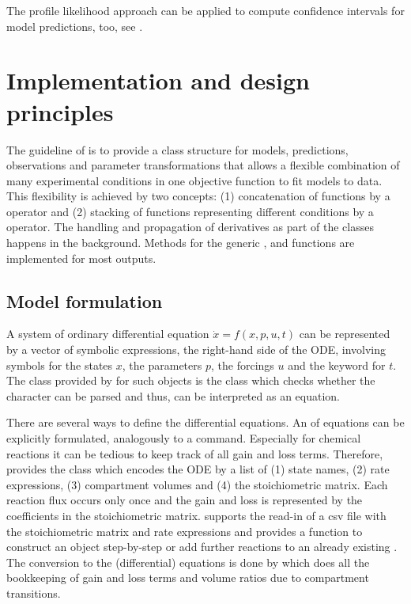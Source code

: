 \documentclass[article]{jss}
\begin{document}
The profile likelihood approach can be applied to compute confidence intervals for model predictions, too, see \citep{kreutz2012likelihood, hass2016fast}.





\section{Implementation and design principles}
\label{sec:implementation}

The guideline of  is to provide a class structure for models, predictions, observations and parameter transformations that allows a flexible combination of many experimental conditions in one objective function to fit models to data. This flexibility is achieved by two concepts: (1) concatenation of functions by a  operator and (2) stacking of functions representing different conditions by a  operator. The handling and propagation of derivatives as part of the classes happens in the background. Methods for the generic ,  and  functions are implemented for most outputs.

\subsection{Model  formulation}

A system of ordinary differential equation $\dot x = f(x, p, u, t)$ can be represented by a  vector of symbolic expressions, the right-hand side of the ODE, involving symbols for the states $x$, the parameters $p$, the forcings $u$ and the keyword  for $t$. The class provided by  for such objects is the  class which checks whether the character can be parsed and thus, can be interpreted as an equation.

There are several ways to define the differential equations. An  of equations can be explicitly formulated, analogously to a  command. Especially for chemical reactions it can be tedious to keep track of all gain and loss terms. Therefore,  provides the  class which encodes the ODE by a list of (1) state names, (2) rate expressions, (3) compartment volumes and (4) the stoichiometric matrix. Each reaction flux occurs only once and the gain and loss is represented by the coefficients in the stoichiometric matrix.  supports the read-in of a csv file with the stoichiometric matrix and rate expressions and provides a function  to construct an  object step-by-step or add further reactions to an already existing . The conversion to the (differential) equations is done by  which does all the bookkeeping of gain and loss terms and volume ratios due to compartment transitions.
\end{document}
